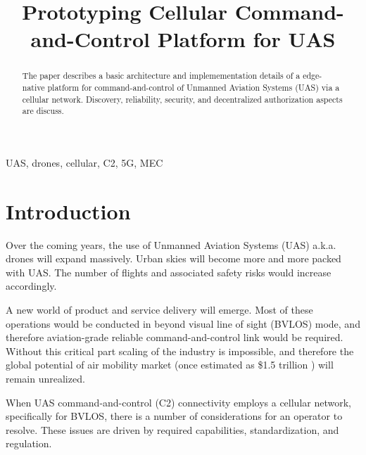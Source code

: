 \documentclass[a4paper,conference]{IEEEtran}
\newcommand{\authorfont}{\fontsize{11pt}{10pt}\selectfont}
\begin{document}
\title{Prototyping Cellular Command-and-Control Platform for UAS \\\vspace{10pt} }

\author{\IEEEauthorblockN{\authorfont Boris Resnick}
}

\maketitle

\begin{abstract}
The paper describes a basic architecture and implemementation details of a edge-native platform for command-and-control of Unmanned Aviation Systems (UAS) via a cellular network. Discovery, reliability, security, and decentralized authorization aspects are discuss.
\end{abstract}

\begin{IEEEkeywords}
UAS, drones, cellular, C2, 5G, MEC
\end{IEEEkeywords}

\section{Introduction}
Over the coming years, the use of Unmanned Aviation Systems (UAS) a.k.a. drones will expand massively. Urban skies will become more and more packed with UAS. The number of flights and associated safety risks would increase accordingly.

A new world of product and service delivery will emerge. Most of these operations would be conducted in beyond visual line of sight (BVLOS) mode, and therefore aviation-grade reliable command-and-control link would be required. Without this critical part scaling of the industry is impossible, and therefore the global potential of air mobility market (once estimated as \$1.5 trillion \cite{market}) will remain unrealized. 

When UAS command-and-control (C2) connectivity employs a cellular network, specifically for BVLOS, there is a number of considerations for an operator to resolve. These issues are driven by required capabilities, standardization, and regulation.
\end{document}
